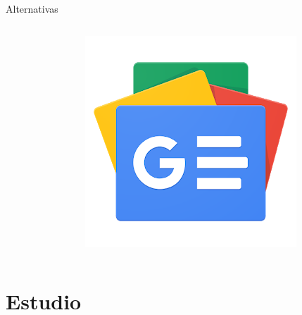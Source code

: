 \documentclass[12pt]{beamer}
\begin{document}
\begin{frame}{Alternativas}
\begin{columns}[onlytextwidth]
\begin{column}{0.3\textwidth}
				\end{column}
				\begin{column}{0.3\textwidth}
					\includegraphics[width=\textwidth,height=0.8\textheight,keepaspectratio]{img/alternativas/gnews_logo}
				\end{column}
			\end{columns}
		\end{frame}
	
	
	\section{Estudio}
		{
			\begin{frame}[plain]
			\end{frame}
		}
\end{document}

